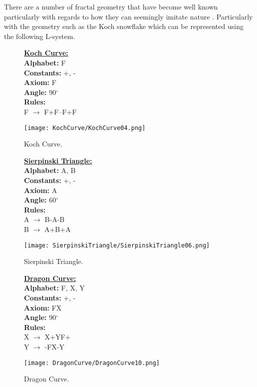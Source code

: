 There are a number of fractal geometry that have become well known particularly with regards to how they can seemingly imitate nature \cite{mandelbrot1982fractal}. Particularly with the geometry such as the Koch snowflake which can be represented using the following L-system.

\begin{figure}[htbp]
	\raggedright
	\textbf{\underline{Koch Curve:}} \\
	\textbf{Alphabet:} F \\
	\textbf{Constants:} +, - \\
	\textbf{Axiom:} F \\
	\textbf{Angle:} 90$^\circ$ \\
	\textbf{Rules:} \\
	F $\rightarrow$ F+F--F+F\\
	{\centering
		\vspace{7px}
		\texttt{[image: KochCurve/KochCurve04.png]}
		\caption{Koch Curve.}
	}
\end{figure}
\begin{figure}[htbp]
	\raggedright
	\textbf{\underline{Sierpinski Triangle:}} \\
	\textbf{Alphabet:} A, B \\
	\textbf{Constants:} +, - \\
	\textbf{Axiom:} A \\
	\textbf{Angle:} 60$^\circ$ \\
	\textbf{Rules:} \\
	A $\rightarrow$  B-A-B \\
	B $\rightarrow$ A+B+A\\
	{\centering
		\vspace{7px}
		\texttt{[image: SierpinskiTriangle/SierpinskiTriangle06.png]}
		\caption{Sierpinski Triangle.}
	}
\end{figure}
\begin{figure}[htbp]
	\raggedright
	\textbf{\underline{Dragon Curve:}} \\
	\textbf{Alphabet:} F, X, Y \\
	\textbf{Constants:} +, - \\
	\textbf{Axiom:} FX \\
	\textbf{Angle:} 90$^\circ$ \\
	\textbf{Rules:} \\
	X $\rightarrow$ X+YF+ \\
	Y $\rightarrow$ -FX-Y\\
	{\centering
		\vspace{7px}
		\texttt{[image: DragonCurve/DragonCurve10.png]}
		\caption{Dragon Curve.}
	}
\end{figure}

